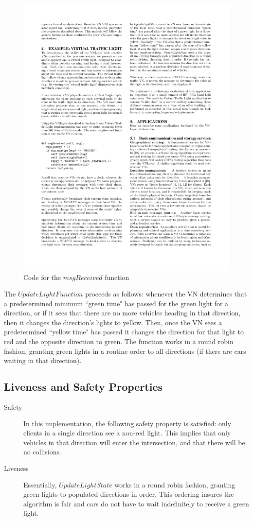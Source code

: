 \documentclass[12pt]{article}
\begin{document}
\begin{figure}
\begin{center}
\includegraphics[width=.65\textwidth]{vnlayerAlg.pdf}
\caption{Code for the $msgReceived$ function \cite{vnlayer}}
\label{fig:vnlayerAlg}
\end{center}
\end{figure}
The $UpdateLightFunction$ proceeds as follows: whenever the VN determines that a predetermined minimum ``green time" has passed for the green light for a direction, or if it sees that there are no more vehicles heading in that direction, then it changes the direction's lights to yellow.  Then, once the VN sees a predetermined ``yellow time" has passed it changes the direction for that light to red and the opposite direction to green.  The function works in a round robin fashion, granting green lights in a routine order to all directions (if there are cars waiting in that direction). 

\subsection{Liveness and Safety Properties}
\begin{description}
\item[Safety]
 In this implementation, the following safety property is satisfied: only clients in a single direction see a non-red light. This implies that only vehicles in that direction will enter the intersection, and that there will be no collisions.
\item[Liveness] 
 Essentially, $UpdateLightState$ works in a round robin fashion, granting green lights to populated directions in order.  This ordering insures the algorithm is fair and cars do not have to wait indefinitely to receive a green light. 
\end{description}
\end{document}
